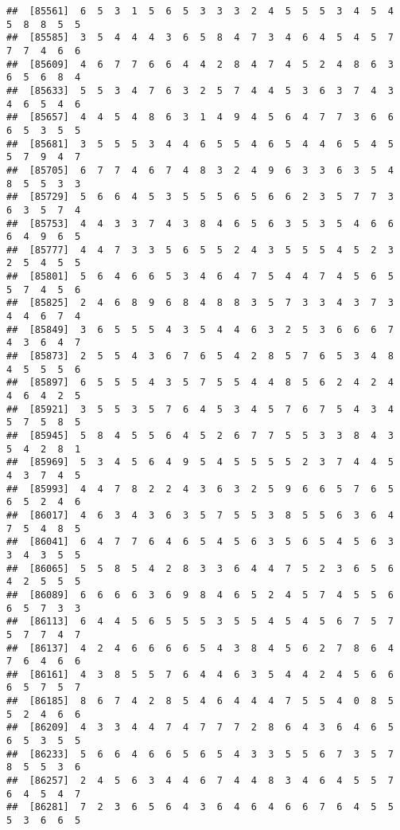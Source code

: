 \documentclass[
]{book}
\begin{document}
\begin{verbatim}
##  [85561]  6  5  3  1  5  6  5  3  3  3  2  4  5  5  5  3  4  5  4  5  8  8  5  5
##  [85585]  3  5  4  4  4  3  6  5  8  4  7  3  4  6  4  5  4  5  7  7  7  4  6  6
##  [85609]  4  6  7  7  6  6  4  4  2  8  4  7  4  5  2  4  8  6  3  6  5  6  8  4
##  [85633]  5  5  3  4  7  6  3  2  5  7  4  4  5  3  6  3  7  4  3  4  6  5  4  6
##  [85657]  4  4  5  4  8  6  3  1  4  9  4  5  6  4  7  7  3  6  6  6  5  3  5  5
##  [85681]  3  5  5  5  3  4  4  6  5  5  4  6  5  4  4  6  5  4  5  5  7  9  4  7
##  [85705]  6  7  7  4  6  7  4  8  3  2  4  9  6  3  3  6  3  5  4  8  5  5  3  3
##  [85729]  5  6  6  4  5  3  5  5  5  6  5  6  6  2  3  5  7  7  3  6  3  5  7  4
##  [85753]  4  4  3  3  7  4  3  8  4  6  5  6  3  5  3  5  4  6  6  6  4  9  6  5
##  [85777]  4  4  7  3  3  5  6  5  5  2  4  3  5  5  5  4  5  2  3  2  5  4  5  5
##  [85801]  5  6  4  6  6  5  3  4  6  4  7  5  4  4  7  4  5  6  5  5  7  4  5  6
##  [85825]  2  4  6  8  9  6  8  4  8  8  3  5  7  3  3  4  3  7  3  4  4  6  7  4
##  [85849]  3  6  5  5  5  4  3  5  4  4  6  3  2  5  3  6  6  6  7  4  3  6  4  7
##  [85873]  2  5  5  4  3  6  7  6  5  4  2  8  5  7  6  5  3  4  8  4  5  5  5  6
##  [85897]  6  5  5  5  4  3  5  7  5  5  4  4  8  5  6  2  4  2  4  4  6  4  2  5
##  [85921]  3  5  5  3  5  7  6  4  5  3  4  5  7  6  7  5  4  3  4  5  7  5  8  5
##  [85945]  5  8  4  5  5  6  4  5  2  6  7  7  5  5  3  3  8  4  3  5  4  2  8  1
##  [85969]  5  3  4  5  6  4  9  5  4  5  5  5  5  2  3  7  4  4  5  4  3  7  4  5
##  [85993]  4  4  7  8  2  2  4  3  6  3  2  5  9  6  6  5  7  6  5  6  5  2  4  6
##  [86017]  4  6  3  4  3  6  3  5  7  5  5  3  8  5  5  6  3  6  4  7  5  4  8  5
##  [86041]  6  4  7  7  6  4  6  5  4  5  6  3  5  6  5  4  5  6  3  3  4  3  5  5
##  [86065]  5  5  8  5  4  2  8  3  3  6  4  4  7  5  2  3  6  5  6  4  2  5  5  5
##  [86089]  6  6  6  6  3  6  9  8  4  6  5  2  4  5  7  4  5  5  6  6  5  7  3  3
##  [86113]  6  4  4  5  6  5  5  5  3  5  5  4  5  4  5  6  7  5  7  5  7  7  4  7
##  [86137]  4  2  4  6  6  6  6  5  4  3  8  4  5  6  2  7  8  6  4  7  6  4  6  6
##  [86161]  4  3  8  5  5  7  6  4  4  6  3  5  4  4  2  4  5  6  6  6  5  7  5  7
##  [86185]  8  6  7  4  2  8  5  4  6  4  4  4  7  5  5  4  0  8  5  5  2  4  6  6
##  [86209]  4  3  3  4  4  7  4  7  7  7  2  8  6  4  3  6  4  6  5  6  5  3  5  5
##  [86233]  5  6  6  4  6  6  5  6  5  4  3  3  5  5  6  7  3  5  7  8  5  5  3  6
##  [86257]  2  4  5  6  3  4  4  6  7  4  4  8  3  4  6  4  5  5  7  6  4  5  4  7
##  [86281]  7  2  3  6  5  6  4  3  6  4  6  4  6  6  7  6  4  5  5  5  3  6  6  5

\end{verbatim}
\end{document}
